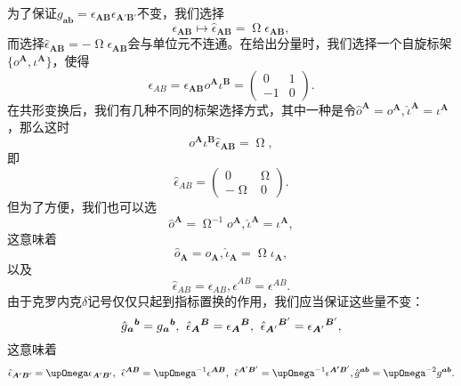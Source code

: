 为了保证$g_{\boldsymbol{ab}} =\epsilon _{\boldsymbol{AB}} \epsilon _{\boldsymbol{A} '\boldsymbol{B} '}$不变，我们选择
\begin{equation*}
	\epsilon _{\boldsymbol{AB}} \mapsto \hat{\epsilon }_{\boldsymbol{AB}} =\upOmega\epsilon _{\boldsymbol{AB}} ,
\end{equation*}
而选择$\hat{\epsilon }_{\boldsymbol{AB}} =-\upOmega\epsilon _{\boldsymbol{AB}}$会与单位元不连通。在给出分量时，我们选择一个自旋标架$\{o^{\boldsymbol{A}} ,\iota ^{\boldsymbol{A}} \}$，使得
\begin{equation*}
	\epsilon _{AB} =\epsilon _{\boldsymbol{AB}} o^{\boldsymbol{A}} \iota ^{\boldsymbol{B}} =\begin{pmatrix}
		0 & 1\\
		-1 & 0
	\end{pmatrix} .
\end{equation*}
在共形变换后，我们有几种不同的标架选择方式，其中一种是令$\hat{o}^{\boldsymbol{A}} =o^{\boldsymbol{A}} ,\hat{\iota }^{\boldsymbol{A}} =\iota ^{\boldsymbol{A}}$，那么这时
\begin{equation*}
	o^{\boldsymbol{A}} \iota ^{\boldsymbol{B}}\hat{\epsilon }_{\boldsymbol{AB}} =\upOmega,
\end{equation*}
即
\begin{equation*}
	\hat{\epsilon }_{AB} =\begin{pmatrix}
		0 & \upOmega\\
		-\upOmega & 0
	\end{pmatrix} .
\end{equation*}
但为了方便，我们也可以选
\begin{equation*}
	\hat{o}^{\boldsymbol{A}} =\upOmega^{-1} o^{\boldsymbol{A}} ,\hat{\iota }^{\boldsymbol{A}} =\iota ^{\boldsymbol{A}} ,
\end{equation*}
这意味着
\begin{equation*}
	\hat{o}_{\boldsymbol{A}} =o_{\boldsymbol{A}} ,\hat{\iota }_{\boldsymbol{A}} =\upOmega\iota _{\boldsymbol{A}} ,
\end{equation*}
以及
\begin{equation*}
	\hat{\epsilon }_{AB} =\epsilon _{AB} ,\hat{\epsilon }^{AB} =\epsilon ^{AB} .
\end{equation*}
由于克罗内克$\delta $记号仅仅只起到指标置换的作用，我们应当保证这些量不变：
\begin{equation*}
	\hat{g}{_{\boldsymbol{a}}}^{\boldsymbol{b}} =g{_{\boldsymbol{a}}}^{\boldsymbol{b}} ,\kern+0.4em \hat{\epsilon }{_{\boldsymbol{A}}}^{\boldsymbol{B}} =\epsilon {_{\boldsymbol{A}}}^{\boldsymbol{B}} ,\kern+0.4em \hat{\epsilon }{_{\boldsymbol{A} '}}^{\boldsymbol{B} '} =\epsilon {_{\boldsymbol{A} '}}^{\boldsymbol{B} '} ,
\end{equation*}
这意味着
\begin{equation*}
	\hat{\epsilon }_{\boldsymbol{A} '\boldsymbol{B} '} =\upOmega\epsilon _{\boldsymbol{A} '\boldsymbol{B} '} ,\kern+0.4em \hat{\epsilon }^{\boldsymbol{AB}} =\upOmega^{-1} \epsilon ^{\boldsymbol{AB}} ,\kern+0.4em \hat{\epsilon }^{\boldsymbol{A} '\boldsymbol{B} '} =\upOmega^{-1} \epsilon ^{\boldsymbol{A'B} '} ,\hat{g}^{\boldsymbol{ab}} =\upOmega^{-2} g^{\boldsymbol{ab}} .
\end{equation*}
